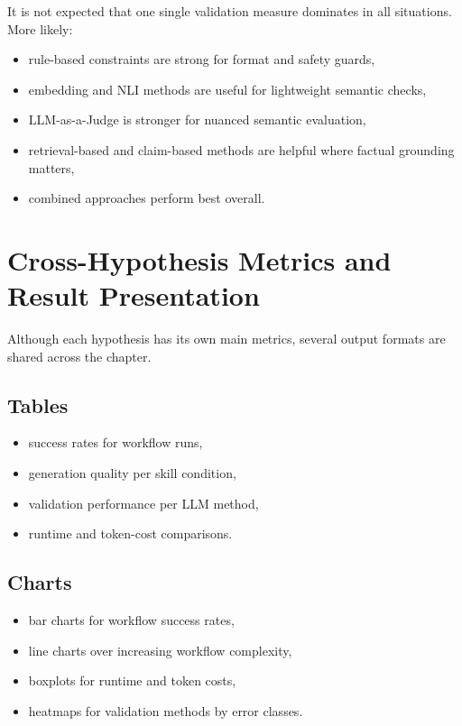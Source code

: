 \documentclass[12pt,a4paper]{article}
\begin{document}
It is not expected that one single validation measure dominates in all situations. More likely:

\begin{itemize}
  \item rule-based constraints are strong for format and safety guards,
  \item embedding and NLI methods are useful for lightweight semantic checks,
  \item LLM-as-a-Judge is stronger for nuanced semantic evaluation,
  \item retrieval-based and claim-based methods are helpful where factual grounding matters,
  \item combined approaches perform best overall.
\end{itemize}

\section{Cross-Hypothesis Metrics and Result Presentation}

Although each hypothesis has its own main metrics, several output formats are shared across the chapter.

\subsection{Tables}

\begin{itemize}
  \item success rates for workflow runs,
  \item generation quality per skill condition,
  \item validation performance per LLM method,
  \item runtime and token-cost comparisons.
\end{itemize}

\subsection{Charts}

\begin{itemize}
  \item bar charts for workflow success rates,
  \item line charts over increasing workflow complexity,
  \item boxplots for runtime and token costs,
  \item heatmaps for validation methods by error classes.
\end{itemize}
\end{document}
